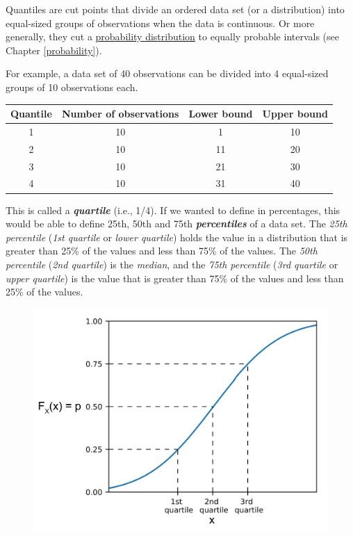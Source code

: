 \documentclass[
  11pt,
]{book}
\theoremstyle{definition}
\theoremstyle{definition}
\theoremstyle{definition}
\theoremstyle{definition}
\theoremstyle{remark}
\begin{document}
\hypertarget{calloutquantile}{}
\begin{callout}[Quantiles]

Quantiles are cut points that divide an ordered data set (or a distribution) into equal-sized groups of observations when the data is continuous. Or more generally, they cut a \protect\hyperlink{probability}{probability distribution} to equally probable intervals (see Chapter \ref{probability}).

For example, a data set of 40 observations can be divided into 4 equal-sized groups of 10 observations each.

\begin{table}[H]
\centering
\begin{tabular}{cccc}
\toprule
Quantile & Number of observations & Lower bound & Upper bound\\
\midrule
1 & 10 & 1 & 10\\
2 & 10 & 11 & 20\\
3 & 10 & 21 & 30\\
4 & 10 & 31 & 40\\
\bottomrule
\end{tabular}
\end{table}

This is called a \textbf{\emph{quartile}} (i.e., 1/4). If we wanted to define in percentages, this would be able to define 25th, 50th and 75th \textbf{\emph{percentiles}} of a data set. The \emph{25th percentile} (\emph{1st quartile} or \emph{lower quartile}) holds the value in a distribution that is greater than 25\% of the values and less than 75\% of the values. The \emph{50th percentile} (\emph{2nd quartile}) is the \emph{median}, and the \emph{75th percentile} (\emph{3rd quartile} or \emph{upper quartile}) is the value that is greater than 75\% of the values and less than 25\% of the values.



\begin{figure}

{\centering \includegraphics[width=0.45\linewidth]{resources/image/1920px-NormalCDFQuartile3} 

}
\end{figure}
\end{callout}
\end{document}
